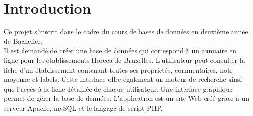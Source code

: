 \section{Introduction}
\noindent Ce projet s'inscrit dans le cadre du cours de bases de données en deuxième année de Bachelier.\\Il est demandé de créer une base de données qui correspond à un annuaire en ligne pour les établissements Horeca de Bruxelles. L'utilisateur peut consulter  la fiche d'un établissement contenant toutes ses propriétés, commentaires, note moyenne et labels. Cette interface offre également un moteur de recherche ainsi que l'accès à la fiche détaillée de chaque utilisateur. Une interface graphique permet de gérer la base de données. L'application est un site Web créé grâce à un serveur Apache, mySQL et le langage de script PHP.\\\\